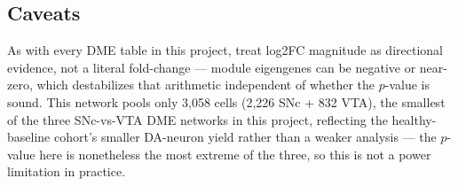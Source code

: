 \documentclass[11pt]{article}
\begin{document}
\subsection*{Caveats}

As with every DME table in this project, treat log2FC magnitude as directional evidence, not
a literal fold-change --- module eigengenes can be negative or near-zero, which destabilizes
that arithmetic independent of whether the $p$-value is sound. This network pools only 3,058
cells (2,226 SNc + 832 VTA), the smallest of the three SNc-vs-VTA DME networks in this
project, reflecting the healthy-baseline cohort's smaller DA-neuron yield rather than a
weaker analysis --- the $p$-value here is nonetheless the most extreme of the three, so this
is not a power limitation in practice.
\end{document}
